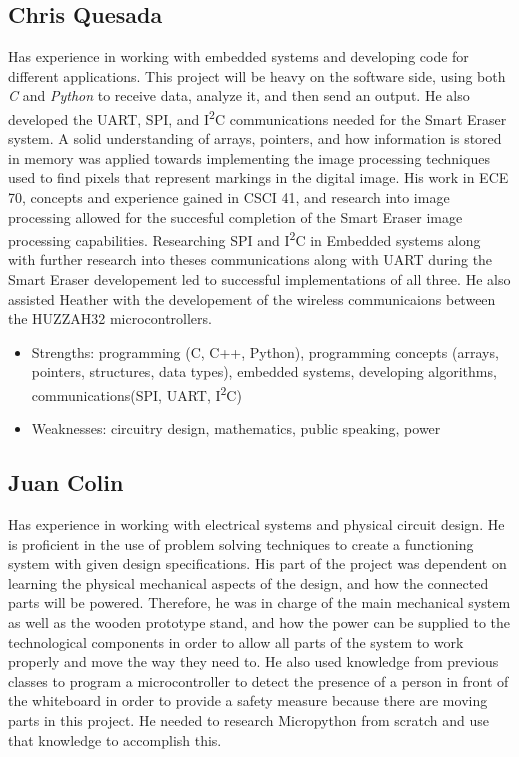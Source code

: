  \subsection{Chris Quesada}
Has experience in working with embedded systems and developing code for different applications. This project will be heavy on the software side, using both \textit{C} and \textit{Python} to receive data, analyze it, and then send an output.  He also developed the UART, SPI, and I\textsuperscript{2}C communications needed for the Smart Eraser system. A solid understanding  of arrays, pointers, and how information is stored in memory was applied towards implementing the  image processing techniques used to find pixels that represent markings in the digital image. His work in ECE 70, concepts and experience gained in CSCI 41, and research into image processing allowed for the succesful completion of the Smart Eraser  image processing capabilities. Researching SPI and I\textsuperscript{2}C in Embedded systems along with further research into theses communications along with UART during the Smart Eraser developement led to successful implementations of all three. He also assisted Heather with the developement of the wireless communicaions between the HUZZAH32 microcontrollers.
\begin{itemize}
	\item Strengths: programming (C, C++, Python),  programming concepts (arrays, pointers, structures, data types), embedded systems, developing algorithms, communications(SPI, UART, I\textsuperscript{2}C)
	
	\item Weaknesses: circuitry design, mathematics, public speaking, power
\end{itemize} \par
 \subsection{Juan Colin}
  Has experience in working with electrical systems and physical circuit design. He is proficient in the use of problem solving techniques to create a functioning system with given design specifications. His part of the project was dependent on learning the physical mechanical aspects of the design, and how the connected parts will be powered. Therefore, he was in charge of the main mechanical system as well as the wooden prototype stand, and how the power can be supplied to the technological components in order to allow all parts of the system to work properly and move the way they need to. He also used knowledge from previous classes to program a microcontroller to detect the presence of a person in front of the whiteboard in order to provide a safety measure because there are moving parts in this project. He needed to research Micropython from scratch and use that knowledge to accomplish this.
  
